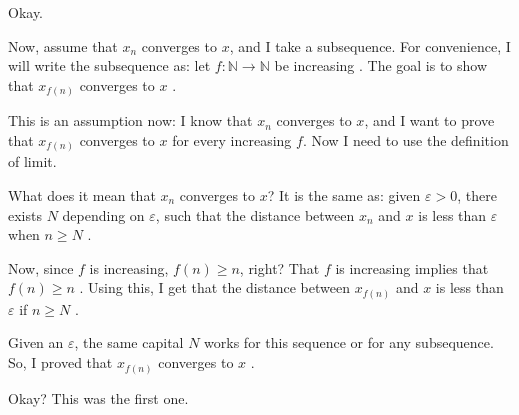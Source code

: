 \begin{speech}[00:32:51 - 00:35:20]
 Okay.

Now, assume that $x_n$ converges to $x$, and I take a subsequence. For convenience, I will write the subsequence as: let $f \colon \mathbb{N} \to \mathbb{N}$ be increasing . The goal is to show that $x_{f(n)}$ converges to $x$ .

This is an assumption now: I know that $x_n$ converges to $x$, and I want to prove that $x_{f(n)}$ converges to $x$ for every increasing $f$. Now I need to use the definition of limit.

What does it mean that $x_n$ converges to $x$? It is the same as: given $\varepsilon > 0$, there exists $N$ depending on $\varepsilon$, such that the distance between $x_n$ and $x$ is less than $\varepsilon$ when $n \ge N$ .

Now, since $f$ is increasing, $f(n) \ge n$, right?  That $f$ is increasing implies that $f(n) \ge n$ . Using this, I get that the distance between $x_{f(n)}$ and $x$ is less than $\varepsilon$ if $n \ge N$ .

Given an $\varepsilon$, the same capital $N$ works for this sequence or for any subsequence. So, I proved that $x_{f(n)}$ converges to $x$ .

Okay? This was the first one.
\end{speech}

